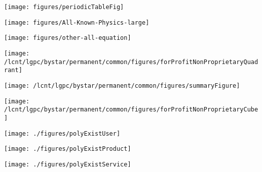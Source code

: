 \documentclass[twoside]{book}
\begin{document}
\setcounter{page}{2}

\begin{center}
\texttt{[image: figures/periodicTableFig]}
\end{center}

\clearpage%

\begin{center}
\texttt{[image: figures/All-Known-Physics-large]}
\end{center}

\clearpage%

\begin{center}
\texttt{[image: figures/other-all-equation]}
\end{center}

\clearpage%
\newcommand{\inprod}[1]{\left\langle #1 \right\rangle}

\begin{center}
\texttt{[image: /lcnt/lgpc/bystar/permanent/common/figures/forProfitNonProprietaryQuadrant]}
\end{center}

\clearpage%

\begin{center}
\texttt{[image: /lcnt/lgpc/bystar/permanent/common/figures/summaryFigure]}
\end{center}

\clearpage%

\begin{center}
\texttt{[image: /lcnt/lgpc/bystar/permanent/common/figures/forProfitNonProprietaryCube]}
\end{center}

\clearpage%

\begin{center}
\texttt{[image: ./figures/polyExistUser]}
\end{center}

\clearpage%

\begin{center}
\texttt{[image: ./figures/polyExistProduct]}
\end{center}

\clearpage%

\begin{center}
\texttt{[image: ./figures/polyExistService]}
\end{center}

\clearpage%
\end{document}

